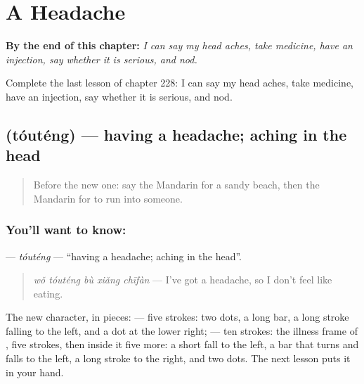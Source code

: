 
\chapter{A Headache}
\label{ch:zh-a-headache}

\begin{chapteropening}
\textbf{By the end of this chapter:} \emph{I can say my head aches, take medicine, have an injection, say whether it is serious, and nod.}

Complete the last lesson of chapter 228: I can say my head aches, take medicine, have an injection, say whether it is serious, and nod.
\end{chapteropening}

\section[\texorpdfstring{\zh{头疼} (tóuténg)}{头疼 (tóuténg)}]{ (tóuténg) — having a headache; aching in the head}

\label{lesson:ZH-C228-touteng}



\begin{quote}
Before the new one: say the Mandarin for a sandy beach, then the Mandarin for to run into someone.
\end{quote}

\subsection*{You'll want to know: }
\textbf{} — \emph{tóuténg} — \textquotedblleft{}having a headache; aching in the head\textquotedblright{}.

\begin{quote}
\textbf{} \emph{wǒ tóuténg bù xiǎng chīfàn} — I've got a headache, so I don't feel like eating.
\end{quote}

The new character, in pieces:  — five strokes: two dots, a long bar, a long stroke falling to the left, and a dot at the lower right;  — ten strokes: the illness frame of , five strokes, then inside it five more: a short fall to the left, a bar that turns and falls to the left, a long stroke to the right, and two dots. The next lesson puts it in your hand.

